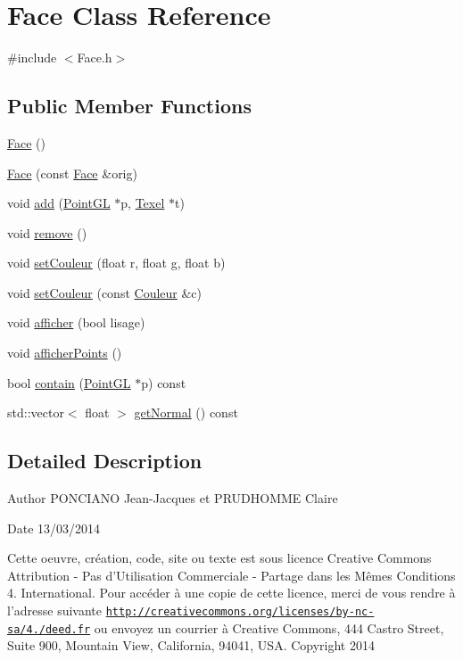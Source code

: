 \hypertarget{classFace}{\section{Face Class Reference}
\label{classFace}
}


{\ttfamily \#include $<$Face.\-h$>$}

\subsection*{Public Member Functions}
\begin{DoxyCompactItemize}
\item 
\hyperlink{classFace_afdb634bc2d5287ba0d62e46b57e9dc2e}{Face} ()
\item 
\hyperlink{classFace_a88e0725fb26500f174570372df28d6bf}{Face} (const \hyperlink{classFace}{Face} \&orig)
\item 
void \hyperlink{classFace_af060c26d3c550669b1796df41f08aed0}{add} (\hyperlink{classPointGL}{Point\-G\-L} $\ast$p, \hyperlink{classTexel}{Texel} $\ast$t)
\item 
void \hyperlink{classFace_a18e74dbfbb4bde83cc890c1664ce094b}{remove} ()
\item 
void \hyperlink{classFace_aaef76e86d3cc05d4ffe0fd34ae711a3b}{set\-Couleur} (float r, float g, float b)
\item 
void \hyperlink{classFace_a89341dffe04ab3d4ce3f64ea48039e54}{set\-Couleur} (const \hyperlink{classCouleur}{Couleur} \&c)
\item 
void \hyperlink{classFace_a624ad3f0698d8ece2db54edce2f1497a}{afficher} (bool lisage)
\item 
void \hyperlink{classFace_a3a318395a3017afbec8704e8fb0df918}{afficher\-Points} ()
\item 
bool \hyperlink{classFace_a2deb053f5ffee2ed5393ef39754466cf}{contain} (\hyperlink{classPointGL}{Point\-G\-L} $\ast$p) const 
\item 
std\-::vector$<$ float $>$ \hyperlink{classFace_a75e299e2d14ba3f888272edd9a8c866f}{get\-Normal} () const 
\end{DoxyCompactItemize}


\subsection{Detailed Description}
\begin{DoxyAuthor}{Author}
P\-O\-N\-C\-I\-A\-N\-O Jean-\/\-Jacques et P\-R\-U\-D\-H\-O\-M\-M\-E Claire 
\end{DoxyAuthor}
\begin{DoxyDate}{Date}
13/03/2014
\end{DoxyDate}
Cette oeuvre, création, code, site ou texte est sous licence Creative Commons Attribution -\/ Pas d’\-Utilisation Commerciale -\/ Partage dans les Mêmes Conditions 4. International. Pour accéder à une copie de cette licence, merci de vous rendre à l'adresse suivante \href{http://creativecommons.org/licenses/by-nc-sa/4.0/deed.fr}{\tt http\-://creativecommons.\-org/licenses/by-\/nc-\/sa/4./deed.\-fr} ou envoyez un courrier à Creative Commons, 444 Castro Street, Suite 900, Mountain View, California, 94041, U\-S\-A. Copyright 2014

